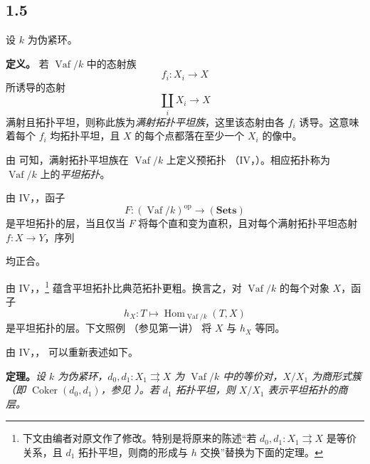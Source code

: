 \subsection*{1.5} \label{sga3:VIIB:1.5}

设 \(k\) 为伪紧环。

\medskip\noindent\textbf{定义。} \label{sga3:VIIB:1.5.definition} 若 \(\operatorname{Vaf}/k\) 中的态射族 \[
  f_i:X_i\longrightarrow X
\] 所诱导的态射 \[
  \coprod_i X_i\longrightarrow X
\] 满射且拓扑平坦，则称此族为\emph{满射拓扑平坦族}，这里该态射由各 \(f_i\) 诱导。这意味着每个 \(f_i\) 均拓扑平坦，且 \(X\) 的每个点都落在至少一个 \(X_i\) 的像中。

由  可知，满射拓扑平坦族在 \(\operatorname{Vaf}/k\) 上定义预拓扑 \textup{（IV，）}。相应拓扑称为 \(\operatorname{Vaf}/k\) 上的\emph{平坦拓扑}。

由 IV，，函子 \[
  F:(\operatorname{Vaf}/k)^{\mathrm{op}}\longrightarrow
  (\mathbf{Sets})
\] 是平坦拓扑的层，当且仅当 \(F\) 将每个直和变为直积，且对每个满射拓扑平坦态射 \(f:X\to Y\)，序列\begin{center} \label{sga3:VIIB:1.5:flat-sheaf-sequence} \end{center}均正合。

由 IV，，\footnote{\label{sga3:VIIB:nde:69}下文由编者对原文作了修改。特别是将原来的陈述“若 \(d_0,d_1:X_1\rightrightarrows X\) 是等价关系，且 \(d_1\) 拓扑平坦，则商的形成与 \(h\) 交换”替换为下面的定理。} 蕴含平坦拓扑比典范拓扑更粗。换言之，对 \(\operatorname{Vaf}/k\) 的每个对象 \(X\)，函子 \[
  h_X:T\longmapsto
  \operatorname{Hom}_{\operatorname{Vaf}/k}(T,X)
\] 是平坦拓扑的层。下文照例 \textup{（参见第一讲）} 将 \(X\) 与 \(h_X\) 等同。

由 IV，， 可以重新表述如下。

\medskip\noindent\textbf{定理。} \label{sga3:VIIB:1.5.theorem}\textit{设 \(k\) 为伪紧环，\(d_0,d_1:X_1\rightrightarrows X\) 为 \(\operatorname{Vaf}/k\) 中的等价对，\(X/X_1\) 为商形式簇 \textup{（即 \(\operatorname{Coker}(d_0,d_1)\)，参见 ）}。若 \(d_1\) 拓扑平坦，则 \(X/X_1\) 表示平坦拓扑的商层。}
